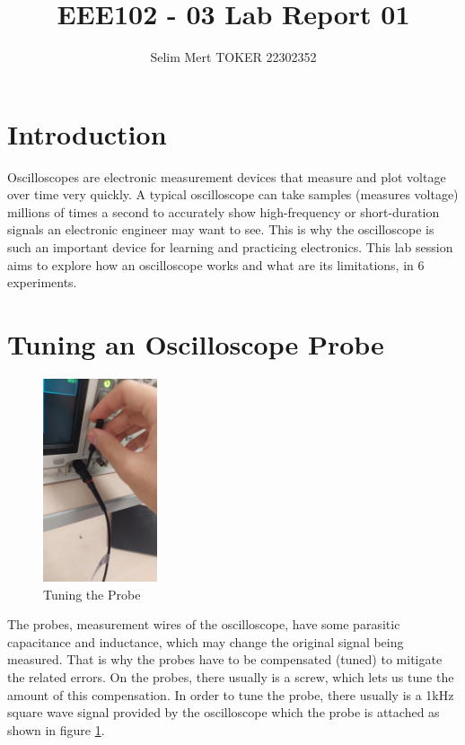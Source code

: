 \documentclass[a4paper, 12pt]{article}
\title{\Large EEE102 - 03 \qquad Lab Report 01\\ \small \hrulefill}
\date{}
\author{Selim Mert TOKER 22302352}
\begin{document}
\maketitle

\section{Introduction}

Oscilloscopes are electronic measurement devices that measure and plot voltage over time very quickly.
A typical oscilloscope can take samples (measures voltage) millions of times a second to accurately show high-frequency or short-duration signals an electronic engineer may want to see.
This is why the oscilloscope is such an important device for learning and practicing electronics.
This lab session aims to explore how an oscilloscope works and what are its limitations, in 6 experiments.

\section{Tuning an Oscilloscope Probe}

\begin{figure}
	\vspace{-1cm}
	\centering
	\includegraphics[width=0.3\textwidth]{1.0.jpg}
	\caption{Tuning the Probe}
	\label{fig:probe-comp}
\end{figure}

The probes, measurement wires of the oscilloscope, have some parasitic capacitance and inductance, which may change the original signal being measured.
That is why the probes have to be compensated (tuned) to mitigate the related errors.
On the probes, there usually is a screw, which lets us tune the amount of this compensation.
In order to tune the probe, there usually is a 1kHz square wave signal provided by the oscilloscope which the probe is attached as shown in figure \ref{fig:probe-comp}.
\end{document}
